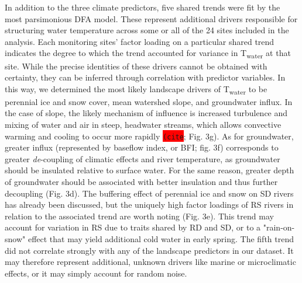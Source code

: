 \documentclass{article}
\begin{document}
In addition to the three climate predictors, five shared trends were fit by the most parsimonious DFA model. These represent additional drivers responsible for structuring water temperature across some or all of the 24 sites included in the analysis. Each monitoring sites' factor loading on a particular shared trend indicates the degree to which the trend accounted for variance in T\textsubscript{water} at that site. While the precise identities of these drivers cannot be obtained with certainty, they can be inferred through correlation with predictor variables. In this way, we determined the most likely landscape drivers of T\textsubscript{water} to be perennial ice and snow cover, mean watershed slope, and groundwater influx. In the case of slope, the likely mechanism of influence is increased turbulence and mixing of water and air in steep, headwater streams, which allows convective warming and cooling to occur more rapidly \colorbox{red}{\lstinline{(cite}}; Fig. 3g). As for groundwater, greater influx (represented by baseflow index, or BFI; fig. 3f) corresponds to greater {\it de}-coupling of climatic effects and river temperature, as groundwater should be insulated relative to surface water. For the same reason, greater depth of groundwater should be associated with better insulation and thus further decoupling (Fig. 3d). The buffering effect of perennial ice and snow on SD rivers has already been discussed, but the uniquely high factor loadings of RS rivers in relation to the associated trend are worth noting (Fig. 3e). This trend may account for variation in RS due to traits shared by RD and SD, or to a "rain-on-snow" effect that may yield additional cold water in early spring. The fifth trend did not correlate strongly with any of the landscape predictors in our dataset. It may therefore represent additional, unknown drivers like marine or microclimatic effects, or it may simply account for random noise.
\end{document}
